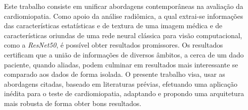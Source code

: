 \begin{resumo}
Este trabalho consiste em unificar abordagens contemporâneas na avaliação da cardiomiopatia. Como apoio da análise radiômica, a qual extrai-se informações das características estatísticas e de textura de uma imagem médica e de características oriundas de uma rede neural clássica para visão computacional, como a \textit{ResNet50}, é possível obter resultados promissores. Os resultados certificam que a união de informações de diversos âmbitos, a cerca de um dado paciente, quando aliadas, podem culminar em resultados mais interessante se comparado aos dados de forma isolada. O presente trabalho visa, usar as abordagens citadas, baseado em literaturas prévias, efetuando uma aplicação inédita para o teste de cardiomiopatia, adaptando e propondo uma arquitetura mais robusta de forma obter bons resultados.

 
\end{resumo}